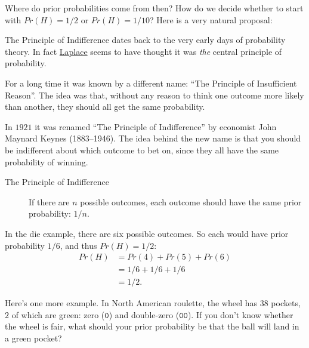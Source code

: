 \documentclass[justified]{tufte-book}
\newcommand{\pr}{Pr}
\theoremstyle{definition}
\theoremstyle{definition}
\theoremstyle{definition}
\theoremstyle{remark}
\begin{document}
Where do prior probabilities come from then? How do we decide whether to
start with \(\pr(H) = 1/2\) or \(\pr(H) = 1/10\)? Here is a very natural
proposal:

\begin{marginfigure}
The Principle of Indifference dates back to the very early days of
probability theory. In fact \protect\hyperlink{fig:laplace}{Laplace}
seems to have thought it was \emph{the} central principle of
probability.

For a long time it was known by a different name: ``The Principle of
Insufficient Reason''. The idea was that, without any reason to think
one outcome more likely than another, they should all get the same
probability.

In \(1921\) it was renamed ``The Principle of Indifference'' by
economist John Maynard Keynes (1883--1946). The idea behind the new name
is that you should be indifferent about which outcome to bet on, since
they all have the same probability of winning.
\end{marginfigure}

\begin{description}
\item[The Principle of Indifference]
If there are \(n\) possible outcomes, each outcome should have the same
prior probability: \(1/n\).
\end{description}

In the die example, there are six possible outcomes. So each would have
prior probability \(1/6\), and thus \(\pr(H) = 1/2\): \[
  \begin{aligned}
    \pr(H) &= \pr(4) + \pr(5) + \pr(6)\\
          &= 1/6 + 1/6 + 1/6\\
          &= 1/2.
  \end{aligned}
\]

Here's one more example. In North American roulette, the wheel has
\(38\) pockets, \(2\) of which are green: zero (\(\mathtt{0}\)) and
double-zero (\(\mathtt{00}\)). If you don't know whether the wheel is
fair, what should your prior probability be that the ball will land in a
green pocket?
\end{document}
